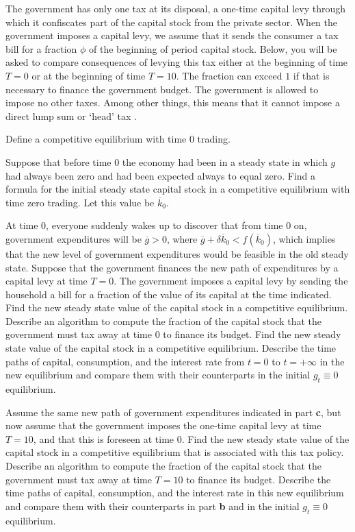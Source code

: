  The government has only one tax at its disposal, a one-time capital levy through which it confiscates part of the capital stock from the private sector. When the government imposes a capital levy, we
 assume that it sends the consumer a tax bill for a fraction $\phi$ of the beginning of period capital stock. Below, you will be asked to compare consequences
 of levying this tax either at the beginning of time $T=0$ or at the beginning of time $T=10$.  The fraction can  exceed
 $1$ if that is necessary to finance the government budget. The government is allowed to impose no other taxes. Among other things,
 this means that it cannot impose a direct lump sum or `head' tax .

 \medskip
  Define a competitive equilibrium with time $0$ trading.

 \medskip
   Suppose that  before time $0$ the economy had been in a steady state in which $g$ had always been zero and had been
 expected always to equal zero.  Find a formula for the initial steady state capital stock in a competitive equilibrium with time
 zero trading. Let this value be $\overline k_0$.

 \medskip
   At time $0$, everyone suddenly wakes up to discover that from time $0$ on, government expenditures will
 be $\overline g> 0$, where $ \overline g + \delta \overline k_0 < f(\overline k_0)$, which implies that the new level of government expenditures
 would be feasible in the old steady state.  Suppose that the government finances the new path of expenditures by a capital levy at time
 $T=0$.  The government imposes a capital levy by  sending  the household  a bill for a fraction of the value of its capital at the time indicated.
  Find  the new steady state value of the capital stock in a competitive equilibrium. Describe an algorithm to compute the fraction of the capital stock that the government must tax away at time $0$ to finance
 its budget.  Find  the new steady state value of the capital stock in a competitive equilibrium. Describe the time paths of
 capital, consumption, and the interest rate from $t=0$ to $t= +\infty$ in the new equilibrium and compare them with their counterparts in the initial $g_t \equiv
 0$ equilibrium.
 \medskip

   Assume the same new path of government expenditures indicated in part {\bf c}, but now assume
 that the government imposes the one-time capital levy at time $T=10$, and that this is foreseen at time $0$.
 Find  the new steady state value of the capital stock in a competitive equilibrium that is associated with this tax policy.
 Describe an algorithm to compute the fraction of the capital stock that the government must tax away at time $T=10$ to finance
 its budget. Describe the time paths of
 capital, consumption, and the interest rate in this new equilibrium and compare them with their counterparts in part {\bf b} and
 in the initial $g_t \equiv
 0$ equilibrium.

